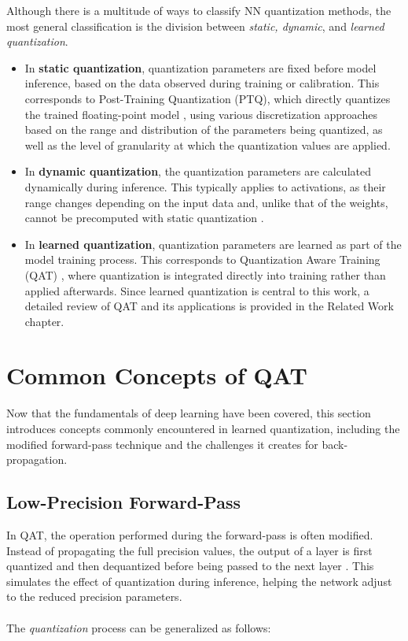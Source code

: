 Although there is a multitude of ways to classify NN quantization methods, the most general classification is the division between \textit{static, dynamic}, and \textit{learned quantization}.
    \begin{itemize}
        \item In \textbf{static quantization}, quantization parameters are fixed before model inference, based on the data observed during training or calibration.
        This corresponds to Post-Training Quantization (PTQ), which directly quantizes the trained floating-point model \cite{jiang2021efficient}, 
        using various discretization approaches based on the range and distribution of the parameters being quantized, 
        as well as the level of granularity at which the quantization values are applied.
        
        \item In \textbf{dynamic quantization}, the quantization parameters are calculated dynamically during inference. 
        This typically applies to activations, as their range changes depending on the input data and, unlike that of the weights, 
        cannot be precomputed with static quantization \cite{kim2021ibert}.
        
        \item In \textbf{learned quantization}, quantization parameters are learned as part of the model training process.
        This corresponds to Quantization Aware Training (QAT) \cite{jacob2018quantization}, where quantization is integrated directly into training rather than applied afterwards.
        Since learned quantization is central to this work, a detailed review of QAT and its applications is provided in the Related Work chapter. 

    \end{itemize}

\section{Common Concepts of QAT}
\label{sec:section2}
Now that the fundamentals of deep learning have been covered, 
this section introduces concepts commonly encountered in learned quantization, 
including the modified forward-pass technique and the challenges it creates for back-propagation.
\subsection{Low-Precision Forward-Pass}
\label{subsec:subsection1}
In QAT, the operation performed during the forward-pass is often modified. Instead of propagating the full precision values, 
the output of a layer is first quantized and then dequantized before being passed to the next layer \cite{jacob2018quantization}. 
This simulates the effect of quantization during inference, helping the network adjust to the reduced precision parameters.
\\
\\
The \textit{quantization} process can be generalized as follows:

